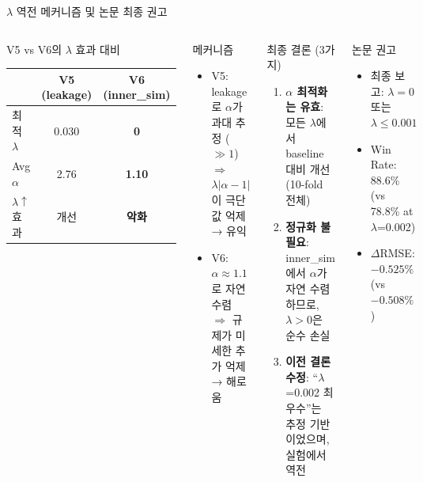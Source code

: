 \documentclass[aspectratio=169,10pt]{beamer}
\begin{document}
\begin{frame}[shrink=8]{$\lambda$ 역전 메커니즘 및 논문 최종 권고}
	\begin{columns}[T]
			\begin{block}{V5 vs V6의 $\lambda$ 효과 대비}
				\renewcommand{\arraystretch}{1.15}
				\small
				\begin{tabular}{l|c|c}
					\toprule
					& V5 (leakage) & V6 (inner\_sim) \\
					\midrule
					최적 $\lambda$ & 0.030 & \textbf{0} \\
					Avg $\alpha$ & 2.76 & \textbf{1.10} \\
					$\lambda\uparrow$ 효과 & 개선 & \textbf{악화} \\
					\bottomrule
				\end{tabular}
			\end{block}

			\vspace{0.2em}
			\begin{exampleblock}{메커니즘}
				\small
				\begin{itemize}\setlength{\itemsep}{2pt}
					\item V5: leakage로 $\alpha$가 과대 추정 ($\gg1$)\\
						$\Rightarrow$ $\lambda|\alpha-1|$이 극단값 억제 → 유익
					\item V6: $\alpha \approx 1.1$로 자연 수렴\\
						$\Rightarrow$ 규제가 미세한 추가 억제 → 해로움
				\end{itemize}
			\end{exampleblock}

			\begin{alertblock}{최종 결론 (3가지)}
				\small
				\begin{enumerate}\setlength{\itemsep}{2pt}
					\item \textbf{$\alpha$ 최적화는 유효}: 모든 $\lambda$에서 baseline 대비 개선 (10-fold 전체)
					\item \textbf{정규화 불필요}: inner\_sim에서 $\alpha$가 자연 수렴하므로, $\lambda>0$은 순수 손실
					\item \textbf{이전 결론 수정}: ``$\lambda$=0.002 최우수''는 추정 기반이었으며, 실험에서 역전
				\end{enumerate}
			\end{alertblock}

			\vspace{0.2em}
			\begin{block}{논문 권고}
				\small
				\begin{itemize}\setlength{\itemsep}{2pt}
					\item 최종 보고: \textbf{$\lambda=0$} 또는 $\lambda \leq 0.001$
					\item Win Rate: 88.6\% (vs 78.8\% at $\lambda$=0.002)
					\item $\Delta$RMSE: $-0.525\%$ (vs $-0.508\%$)
				\end{itemize}
			\end{block}
	\end{columns}
\end{frame}
\end{document}
